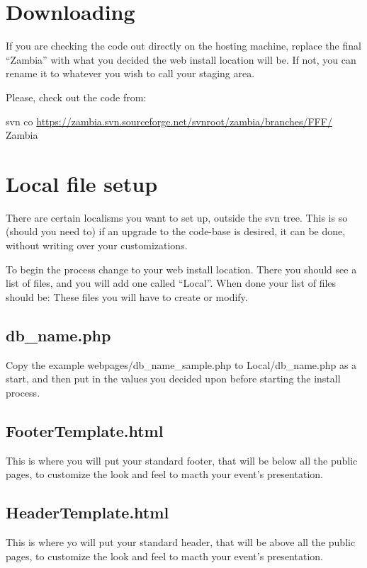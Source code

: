 \documentclass[tablesignature]{scrartcl}
\begin{document}
\section{Downloading}
\label{sec-2}

  If you are checking the code out directly on the hosting machine,
  replace the final ``Zambia'' with what you decided the web install
  location will be.  If not, you can rename it to whatever you wish to
  call your staging area.

  Please, check out the code from:

  svn co \href{https://zambia.svn.sourceforge.net/svnroot/zambia/branches/FFF/}{https://zambia.svn.sourceforge.net/svnroot/zambia/branches/FFF/} Zambia
\section{Local file setup}
\label{sec-3}

  There are certain localisms you want to set up, outside the svn
  tree. This is so (should you need to) if an upgrade to the code-base
  is desired, it can be done, without writing over your
  customizations.

  To begin the process change to your web install location.  There you
  should see a list of files, and you will add one called ``Local''.
  When done your list of files should be:
  These files you will have to create or modify.
\subsection{db\_{}name.php}
\label{sec-3_1}

     Copy the example webpages/db\_{}name\_{}sample.php to Local/db\_{}name.php
     as a start, and then put in the values you decided upon before
     starting the install process.
\subsection{FooterTemplate.html}
\label{sec-3_2}

     This is where you will put your standard footer, that will be
     below all the public pages, to customize the look and feel to
     macth your event's presentation.
\subsection{HeaderTemplate.html}
\label{sec-3_3}

     This is where yo will put your standard header, that will be
     above all the public pages, to customize the look and feel to
     macth your event's presentation.
\end{document}
